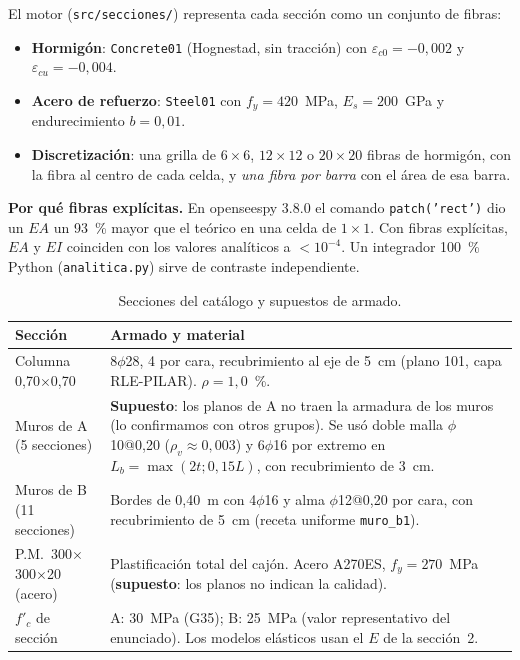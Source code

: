 \documentclass[11pt,a4paper]{article}
\begin{document}
El motor (\texttt{src/secciones/}) representa cada sección como un conjunto de
fibras:
\begin{itemize}
  \item \textbf{Hormigón}: \texttt{Concrete01} (Hognestad, sin tracción) con
        $\varepsilon_{c0} = -0{,}002$ y $\varepsilon_{cu} = -0{,}004$.
  \item \textbf{Acero de refuerzo}: \texttt{Steel01} con $f_y = 420$~MPa,
        $E_s = 200$~GPa y endurecimiento $b = 0{,}01$.
  \item \textbf{Discretización}: una grilla de $6\times6$, $12\times12$ o
        $20\times20$ fibras de hormigón, con la fibra al centro de cada celda, y
        \emph{una fibra por barra} con el área de esa barra.
\end{itemize}

\textbf{Por qué fibras explícitas.} En openseespy 3.8.0 el comando
\texttt{patch('rect')} dio un $EA$ un 93~\% mayor que el teórico en una celda
de $1\times1$. Con fibras explícitas, $EA$ y $EI$ coinciden con los valores
analíticos a $< 10^{-4}$. Un integrador 100~\% Python
(\texttt{analitica.py}) sirve de contraste independiente.

\begin{table}[h]
\centering
\caption{Secciones del catálogo y supuestos de armado.}
\begin{tabularx}{\textwidth}{lX}
\toprule
Sección & Armado y material \\
\midrule
Columna 0,70$\times$0,70 &
8$\phi$28, 4 por cara, recubrimiento al eje de 5~cm (plano 101, capa
RLE-PILAR). $\rho = 1{,}0$~\%. \\
Muros de A (5 secciones) &
\textbf{Supuesto}: los planos de A no traen la armadura de los muros (lo
confirmamos con otros grupos). Se usó doble malla $\phi$10@0,20 ($\rho_v \approx 0{,}003$)
y 6$\phi$16 por extremo en $L_b = \max(2t; 0{,}15L)$, con recubrimiento de 3~cm. \\
Muros de B (11 secciones) &
Bordes de 0,40~m con 4$\phi$16 y alma $\phi$12@0,20 por cara, con recubrimiento
de 5~cm (receta uniforme \texttt{muro\_b1}). \\
P.M.~300$\times$300$\times$20 (acero) &
Plastificación total del cajón. Acero A270ES, $f_y = 270$~MPa
(\textbf{supuesto}: los planos no indican la calidad). \\
\midrule
$f'_c$ de sección &
A: 30~MPa (G35); B: 25~MPa (valor representativo del enunciado). Los modelos
elásticos usan el $E$ de la sección~2. \\
\bottomrule
\end{tabularx}
\end{table}
\end{document}
